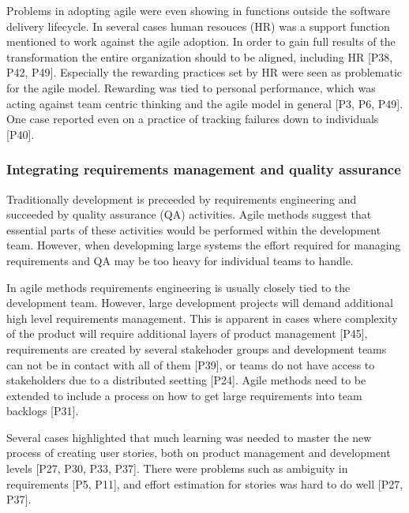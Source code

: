 \documentclass[preprint,authoryear,12pt]{elsarticle}
\begin{document}

Problems in adopting agile were even showing in functions outside the software
delivery lifecycle. In several cases human resouces (HR) was a support function
mentioned to work against the agile adoption. In order to gain full results of
the transformation the entire organization should to be aligned, including HR
[P38, P42, P49].
Especially the rewarding practices set by HR were seen as problematic for the
agile model. Rewarding was tied to personal performance, which was acting
against team centric thinking and the agile model in general [P3, P6, P49].
One case reported even on a practice of tracking failures down to individuals
[P40].


\subsubsection{Integrating requirements management and quality assurance}

Traditionally development is preceeded by requirements engineering and succeeded
by quality assurance (QA) activities. Agile methods suggest that essential parts
of these activities would be performed within the development team. However,
when developming large systems the effort required for managing requirements and
QA may be too heavy for individual teams to handle.


In agile methods requirements engineering is usually closely tied to the
development team. However, large development projects will demand additional
high level requirements management. This is apparent in cases where complexity
of the product will require additional layers of product management [P45],
requirements are created by several stakehoder groups and development teams can
not be in contact with all of them [P39], or teams do not have access to
stakeholders due to a distributed seetting [P24]. Agile methods need to be
extended to include a process on how to get large requirements into team
backlogs [P31].


Several cases highlighted that much learning was needed to master the new
process of creating user stories, both on product management and development
levels [P27, P30, P33, P37]. There were problems such as ambiguity in
requirements [P5, P11], and effort estimation for stories was hard to do well
[P27, P37].
\end{document}
